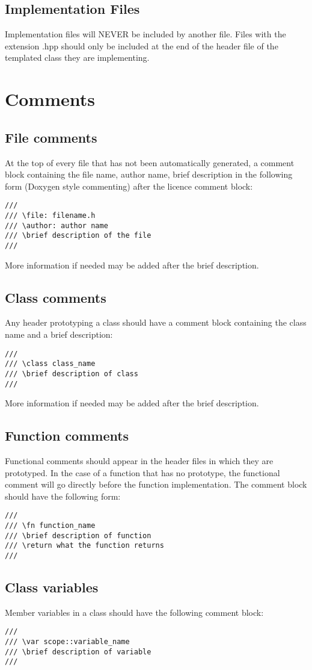 \documentclass[letterpaper,10pt]{article}
\begin{document}
\subsection{Implementation Files}
Implementation files will NEVER be included by another file.  Files with the extension .hpp should only be included at the end of the header file of the templated class they are implementing.
\section{Comments}
\subsection{File comments}
At the top of every file that has not been automatically generated, a comment block containing the file name, author name, brief description in the following form (Doxygen style commenting) after the licence comment block:
\begin{verbatim}
///
/// \file: filename.h
/// \author: author name
/// \brief description of the file
///
\end{verbatim}
More information if needed may be added after the brief description.
\subsection{Class comments}
Any header prototyping a class should have a comment block containing the class name and a brief description:
\begin{verbatim}
///
/// \class class_name
/// \brief description of class
///
\end{verbatim}
More information if needed may be added after the brief description.
\subsection{Function comments}
Functional comments should appear in the header files in which they are prototyped.  In the case of a function that has no prototype, the functional comment will go directly before the function implementation.  The comment block should have the following form:
\begin{verbatim}
///
/// \fn function_name
/// \brief description of function
/// \return what the function returns
///
\end{verbatim}
\subsection{Class variables}
Member variables in a class should have the following comment block:
\begin{verbatim}
///
/// \var scope::variable_name
/// \brief description of variable
///
\end{verbatim}
\end{document}
